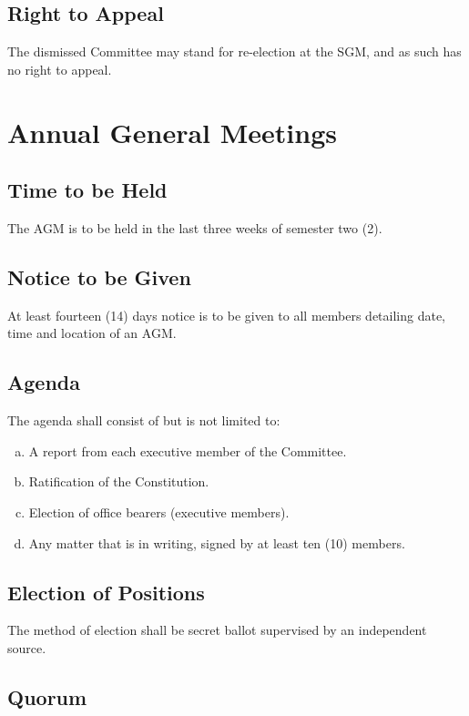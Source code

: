 \documentclass[a4paper,12pt]{article}
\begin{document}
\subsection{Right to Appeal}

The dismissed Committee may stand for re-election at the SGM, and as such has no right to appeal.

\section{Annual General Meetings}

\subsection{Time to be Held}

The AGM is to be held in the last three weeks of semester two (2).

\subsection{Notice to be Given}

At least fourteen (14) days notice is to be given to all members detailing date, time and location of an AGM.

\subsection{Agenda}

The agenda shall consist of but is not limited to:

\begin{enumerate}[a)]
	\item A report from each executive member of the Committee.
	\item Ratification of the Constitution.
	\item Election of office bearers (executive members).
	\item Any matter that is in writing, signed by at least ten (10) members.
\end{enumerate}

\subsection{Election of Positions}

The method of election shall be secret ballot supervised by an independent source.

\subsection{Quorum}
\end{document}
